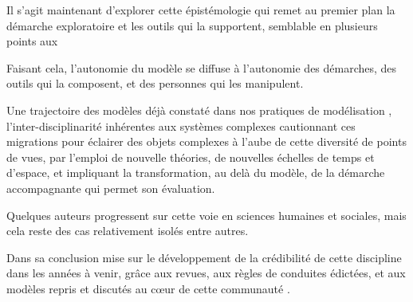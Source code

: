 {Il s'agit maintenant d'explorer cette épistémologie qui remet au premier plan la démarche exploratoire et les outils qui la supportent, semblable en plusieurs points aux 

Faisant cela, l'autonomie du modèle se diffuse à l'autonomie des démarches, des outils qui la composent, et des personnes qui les manipulent. 

Une trajectoire des modèles déjà constaté dans nos pratiques de modélisation \autocite{Banos2013}, l'inter-disciplinarité inhérentes aux systèmes complexes cautionnant ces migrations pour éclairer des objets complexes à l'aube de cette diversité de points de vues, par l'emploi de nouvelle théories, de nouvelles échelles de temps et d'espace, et impliquant la transformation, au delà du modèle, de la démarche accompagnante qui permet son évaluation. 

Quelques auteurs progressent sur cette voie en sciences humaines et sociales, mais cela reste des cas relativement isolés \autocite{Ngo2012} \autocite{Schmitt2014} \autocite{Heppenstall2007} \autocite{Stonedahl2011a} entre autres.

Dans sa conclusion \autocite{Rouchier2013} mise sur le développement de la crédibilité de cette discipline dans les années à venir, grâce aux revues, aux règles de conduites édictées, et aux modèles repris et discutés au cœur de cette communauté \autocite{Hales2003}. 




}
